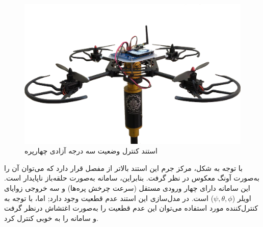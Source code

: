 \begin{figure}[H]
	\includegraphics[width=13cm]{../Figures/introduction/3DOFQuad.png}
	\centering
	\caption{استند کنترل وضعیت سه درجه آزادی چهارپره 
	\cite{Iranlabexpo}}
\label{LabQuad1}
\end{figure}
با توجه به شکل، مرکز جرم این استند بالاتر از مفصل قرار دارد که می‌توان آن را به‌صورت آونگ معکوس در نظر گرفت. بنابراین، سامانه به‌صورت حلقه‌باز ناپایدار است. این سامانه دارای چهار ورودی مستقل (سرعت چرخش پره‌ها) و سه خروجی زوایای اویلر ($\psi, \theta, \phi$) است. در مدل‌سازی این استند عدم قطعیت وجود دارد; اما، با توجه به کنترل‌کننده مورد استفاده می‌توان این عدم قطعیت را به‌صورت اغتشاش درنظر گرفت و سامانه را به خوبی کنترل کرد. 


%
